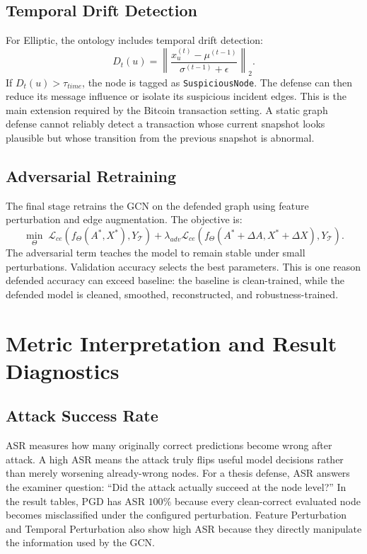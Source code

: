 \documentclass[12pt,oneside]{report}
\begin{document}
\section{Temporal Drift Detection}
For Elliptic, the ontology includes temporal drift detection:
$$
D_t(u)=\left\|\frac{x_u^{(t)}-\mu^{(t-1)}}{\sigma^{(t-1)}+\epsilon}\right\|_2.
$$
If $D_t(u)>\tau_{time}$, the node is tagged as \texttt{SuspiciousNode}. The defense can then reduce its message influence or isolate its suspicious incident edges. This is the main extension required by the Bitcoin transaction setting. A static graph defense cannot reliably detect a transaction whose current snapshot looks plausible but whose transition from the previous snapshot is abnormal.

\section{Adversarial Retraining}
The final stage retrains the GCN on the defended graph using feature perturbation and edge augmentation. The objective is:
$$
\min_{\Theta}\;
\mathcal{L}_{ce}(f_{\Theta}(A^*,X^*),Y_{\mathcal{T}})
+\lambda_{adv}\mathcal{L}_{ce}(f_{\Theta}(A^*+\Delta A,X^*+\Delta X),Y_{\mathcal{T}}).
$$
The adversarial term teaches the model to remain stable under small perturbations. Validation accuracy selects the best parameters. This is one reason defended accuracy can exceed baseline: the baseline is clean-trained, while the defended model is cleaned, smoothed, reconstructed, and robustness-trained.

\chapter{Metric Interpretation and Result Diagnostics}

\section{Attack Success Rate}
ASR measures how many originally correct predictions become wrong after attack. A high ASR means the attack truly flips useful model decisions rather than merely worsening already-wrong nodes. For a thesis defense, ASR answers the examiner question: ``Did the attack actually succeed at the node level?'' In the result tables, PGD has ASR $100\%$ because every clean-correct evaluated node becomes misclassified under the configured perturbation. Feature Perturbation and Temporal Perturbation also show high ASR because they directly manipulate the information used by the GCN.
\end{document}
